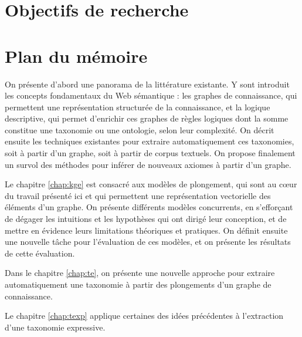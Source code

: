 \section{Objectifs de recherche}  %


\section{Plan du mémoire}  %


On présente d'abord une panorama de la littérature existante. Y sont introduit les concepts fondamentaux du Web sémantique : les graphes de connaissance, qui permettent une représentation structurée de la connaissance, et la logique descriptive, qui permet d'enrichir ces graphes de règles logiques dont la somme constitue une taxonomie ou une ontologie, selon leur complexité. On décrit ensuite les techniques existantes pour extraire automatiquement ces taxonomies, soit à partir d'un graphe, soit à partir de corpus textuels. On propose finalement un survol des méthodes pour inférer de nouveaux axiomes à partir d'un graphe.

Le chapitre \ref{chap:kge} est consacré aux modèles de plongement, qui sont au cœur du travail présenté ici et qui permettent une représentation vectorielle des éléments d'un graphe. On présente différents modèles concurrents, en s'efforçant de dégager les intuitions et les hypothèses qui ont dirigé leur conception, et de mettre en évidence leurs limitations théoriques et pratiques. On définit ensuite une nouvelle tâche pour l'évaluation de ces modèles, et on présente les résultats de cette évaluation.

Dans le chapitre \ref{chap:te}, on présente une nouvelle approche pour extraire automatiquement une taxonomie à partir des plongements d'un graphe de connaissance.

Le chapitre \ref{chap:texp} applique certaines des idées précédentes à l'extraction d'une taxonomie expressive. 
\clearpage